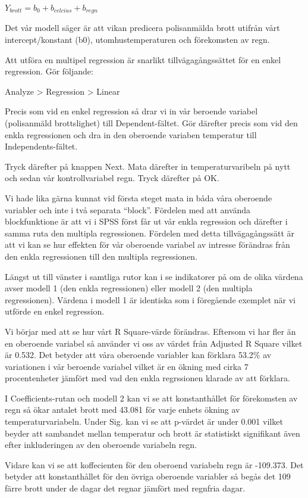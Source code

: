\documentclass[
]{book}
\begin{document}
\(Y_{brott} = b_0 + b_{celcius} + b_{regn}\)

Det vår modell säger är att vikan predicera polisanmälda brott utifrån vårt intercept/konstant (b0), utomhustemperaturen och förekomsten av regn.

Att utföra en multipel regression är snarlikt tillvägagångssättet för en enkel regression. Gör följande:

Analyze \textgreater{} Regression \textgreater{} Linear

Precis som vid en enkel regression så drar vi in vår beroende variabel (polisanmäld brottslighet) till Dependent-fältet. Gör därefter precis som vid den enkla regressionen och dra in den oberoende variaben temperatur till Independents-fältet.

Tryck därefter på knappen Next. Mata därefter in temperaturvaribeln på nytt och sedan vår kontrollvariabel regn. Tryck därefter på OK.

Vi hade lika gärna kunnat vid första steget mata in båda våra oberoende variabler och inte i två separata ``block''. Fördelen med att använda blockfunktione är att vi i SPSS först får ut vår enkla regression och därefter i samma ruta den multipla regressionen. Fördelen med detta tillvägagångssätt är att vi kan se hur effekten för vår oberoende variabel av intresse förändras från den enkla regressionen till den multipla regressionen.

Längst ut till vänster i samtliga rutor kan i se indikatorer på om de olika värdena avser modell 1 (den enkla regressionen) eller modell 2 (den multipla regressionen). Värdena i modell 1 är identiska som i föregående exemplet när vi utförde en enkel regression.

Vi börjar med att se hur vårt R Square-värde förändras. Eftersom vi har fler än en oberoende variabel så använder vi oss av värdet från Adjusted R Square vilket är 0.532. Det betyder att våra oberoende variabler kan förklara 53.2\% av variationen i vår beroende variabel vilket är en ökning med cirka 7 procentenheter jämfört med vad den enkla regrssionen klarade av att förklara.

I Coefficients-rutan och modell 2 kan vi se att konstanthållet för förekomsten av regn så ökar antalet brott med 43.081 för varje enhets ökning av temperaturvariabeln. Under Sig. kan vi se att p-värdet är under 0.001 vilket beyder att sambandet mellan temperatur och brott är statistiskt signifikant även efter inkluderingen av den oberoende variabeln regn.

Vidare kan vi se att koffecienten för den oberoend variabeln regn är -109.373. Det betyder att konstanthållet för den övriga oberoende variabler så begås det 109 färre brott under de dagar det regnar jämfört med regnfria dagar.
\end{document}
